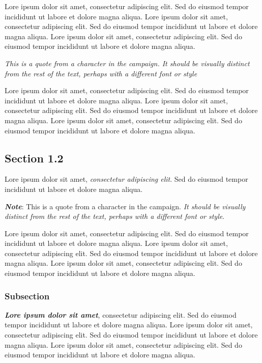 \documentclass[11pt,a4paper]{article}
\newenvironment{twocolumns}
    {\begin{multicols*}{2}}
    {\end{multicols*}}
\renewenvironment{quote}
    {\begin{quotebox}}
    {\end{quotebox}}
\begin{document}
\begin{twocolumns}
Lore ipsum dolor sit amet, consectetur adipiscing elit. Sed do eiusmod
tempor incididunt ut labore et dolore magna aliqua. Lore ipsum dolor sit
amet, consectetur adipiscing elit. Sed do eiusmod tempor incididunt ut
labore et dolore magna aliqua. Lore ipsum dolor sit amet, consectetur
adipiscing elit. Sed do eiusmod tempor incididunt ut labore et dolore
magna aliqua.

\begin{graybox}
\emph{This is a quote from a character in the campaign. It should be
visually distinct from the rest of the text, perhaps with a different
font or style}
\end{graybox}

Lore ipsum dolor sit amet, consectetur adipiscing elit. Sed do eiusmod
tempor incididunt ut labore et dolore magna aliqua. Lore ipsum dolor sit
amet, consectetur adipiscing elit. Sed do eiusmod tempor incididunt ut
labore et dolore magna aliqua. Lore ipsum dolor sit amet, consectetur
adipiscing elit. Sed do eiusmod tempor incididunt ut labore et dolore
magna aliqua.

\hypertarget{section-1.2}{%
\subsection{Section 1.2}\label{section-1.2}}

Lore ipsum dolor sit amet, \emph{consectetur adipiscing elit}. Sed do
eiusmod tempor incididunt ut labore et dolore magna aliqua.

\begin{quote}
\textbf{\emph{Note}}: This is a quote from a character in the campaign.
\emph{It should be visually distinct from the rest of the text, perhaps
with a different font or style}.
\end{quote}

Lore ipsum dolor sit amet, consectetur adipiscing elit. Sed do eiusmod
tempor incididunt ut labore et dolore magna aliqua. Lore ipsum dolor sit
amet, consectetur adipiscing elit. Sed do eiusmod tempor incididunt ut
labore et dolore magna aliqua. Lore ipsum dolor sit amet, consectetur
adipiscing elit. Sed do eiusmod tempor incididunt ut labore et dolore
magna aliqua.

\hypertarget{subsection}{%
\subsubsection{Subsection}\label{subsection}}

\textbf{\emph{Lore ipsum dolor sit amet}}, consectetur adipiscing elit.
Sed do eiusmod tempor incididunt ut labore et dolore magna aliqua. Lore
ipsum dolor sit amet, consectetur adipiscing elit. Sed do eiusmod tempor
incididunt ut labore et dolore magna aliqua. Lore ipsum dolor sit amet,
consectetur adipiscing elit. Sed do eiusmod tempor incididunt ut labore
et dolore magna aliqua.


\end{twocolumns}
\end{document}
